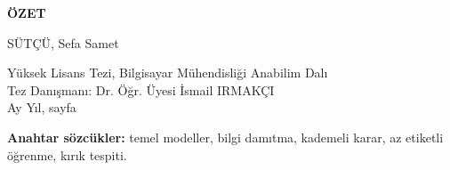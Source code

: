 \setcounter{page}{7}
\begin{center}\textbf{ÖZET}\end{center}
\begin{center}\textbf{\tezadi}\end{center}
\begin{center}SÜTÇÜ, Sefa Samet\end{center}
\begin{center}
Yüksek Lisans Tezi, Bilgisayar Mühendisliği Anabilim Dalı\\
Tez Danışmanı: Dr. Öğr. Üyesi İsmail IRMAKÇI\\
Ay Yıl, \pageref{lastpage} sayfa %
\end{center}


\begin{small}\textbf{Anahtar sözcükler:} temel modeller, bilgi damıtma, kademeli karar, az etiketli öğrenme, kırık tespiti.
\end{small}

\bossayfa
